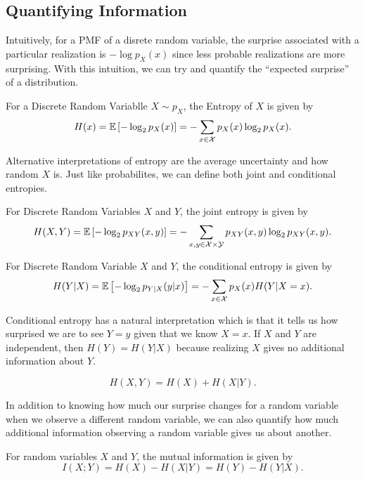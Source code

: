 \subsection{Quantifying Information}
Intuitively, for a PMF of a disrete random variable, the surprise associated with a particular realization is $-\log p_X(x)$ since less probable realizations are more surprising.
With this intuition, we can try and quantify the ``expected surprise'' of a distribution.
\begin{definition}
	For a Discrete Random Variablle $X\sim p_X$, the Entropy of $X$ is given by \[
		H(x) = \mathbb{E}\left[-\log_2 p_X(x)\right] = -\sum_{x\in\mathcal{X}} p_X(x)\log_2p_X(x).
	\]
	\label{defn:entropy}
\end{definition}
Alternative interpretations of entropy are the average uncertainty and how random $X$ is.
Just like probabilites, we can define both joint and conditional entropies.
\begin{definition}
	For Discrete Random Variables $X$ and $Y$, the joint entropy is given by \[
		H(X,Y) = \mathbb{E}\left[-\log_2p_{XY}(x, y)\right] = -\sum_{x,y\in\mathcal{X}\times\mathcal{Y}}p_{XY}(x, y)\log_2p_{XY}(x, y).
	\]
	\label{defn:joint-entropy}
\end{definition}
\begin{definition}
	For Discrete Random Variable $X$ and $Y$, the conditional entropy is given by \[
		H(Y|X) = \mathbb{E}\left[-\log_2p_{Y|X}(y|x)\right] = -\sum_{x\in\mathcal{X}}p_X(x)H(Y|X=x).
	\]
	\label{defn:conditional-entropy}
\end{definition}
Conditional entropy has a natural interpretation which is that it tells us how surprised we are to see $Y=y$ given that we know $X=x$.
If $X$ and $Y$ are independent, then $H(Y) = H(Y|X)$ because realizing $X$ gives no additional information about $Y$.
\begin{theorem}
	\[
		H(X, Y) = H(X) + H(X|Y).
	\]
	\label{thm:chain-entropy}
\end{theorem}
In addition to knowing how much our surprise changes for a random variable when we observe a different random variable, we can also quantify how much additional information observing a random variable gives us about another.
\begin{definition}
	For random variables $X$ and $Y$, the mutual information is given by \[
		I(X;Y) = H(X) - H(X|Y) = H(Y) - H(Y|X).
	\]
	\label{defn:mutual-info}
\end{definition}
